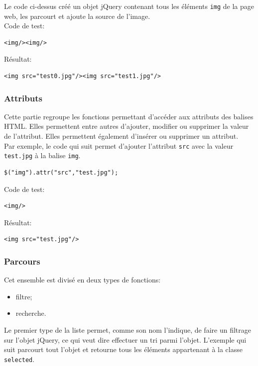 \documentclass[10pt,a4paper,titlepage]{article}
\begin{document}
Le code ci-dessus créé un objet jQuery contenant tous les éléments \texttt{img} de la page web, les parcourt et ajoute la source de l'image.\\

Code de test:
\begin{lstlisting}
<img/><img/>
\end{lstlisting}


Résultat:
\begin{lstlisting}
<img src="test0.jpg"/><img src="test1.jpg"/>
\end{lstlisting}

\subsubsection{Attributs}
Cette partie regroupe les fonctions permettant d'accéder aux attributs des balises HTML. Elles permettent entre autres d'ajouter, modifier ou supprimer la valeur de l'attribut. Elles permettent également d'insérer ou supprimer un attribut.\\

Par exemple, le code qui suit permet d'ajouter l'attribut \texttt{src} avec la valeur \texttt{test.jpg} à la balise \texttt{img}.

\begin{lstlisting}
$("img").attr("src","test.jpg");
\end{lstlisting}


Code de test:
\begin{lstlisting}
<img/>
\end{lstlisting}


Résultat:
\begin{lstlisting}
<img src="test.jpg"/>
\end{lstlisting}

\subsubsection{Parcours}
Cet ensemble est divisé en deux types de fonctions:
\begin{itemize}
	\item filtre;
	\item recherche.\\
\end{itemize}

Le premier type de la liste permet, comme son nom l'indique, de faire un filtrage sur l'objet jQuery, ce qui veut dire effectuer un tri parmi l'objet. L'exemple qui suit parcourt tout l'objet et retourne tous les éléments appartenant à la classe \texttt{selected}.
\end{document}
